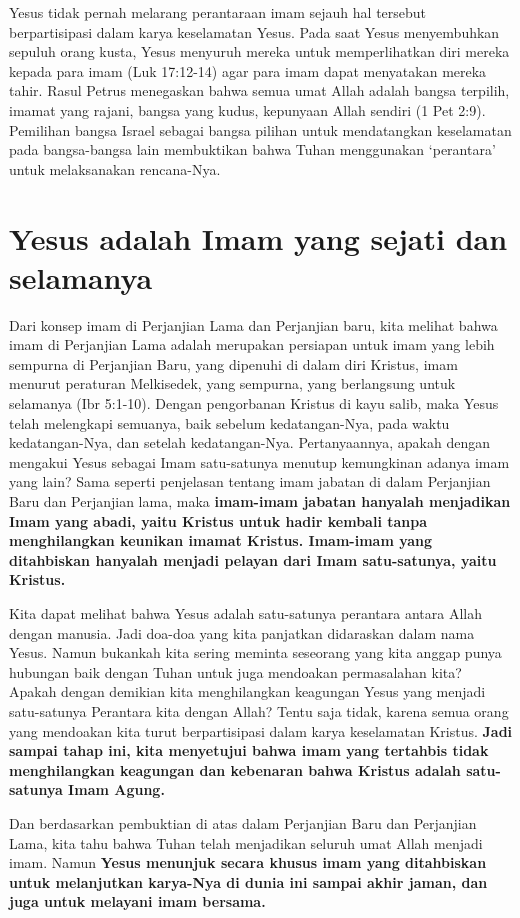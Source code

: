 Yesus tidak pernah melarang perantaraan imam sejauh hal tersebut berpartisipasi dalam karya keselamatan Yesus. Pada saat Yesus menyembuhkan sepuluh orang kusta, Yesus menyuruh mereka untuk memperlihatkan diri mereka kepada para imam (Luk 17:12-14) agar para imam dapat menyatakan mereka tahir. Rasul Petrus menegaskan bahwa semua umat Allah adalah bangsa terpilih, imamat yang rajani, bangsa yang kudus, kepunyaan Allah sendiri (1 Pet 2:9). Pemilihan bangsa Israel sebagai bangsa pilihan untuk mendatangkan keselamatan pada bangsa-bangsa lain membuktikan bahwa Tuhan menggunakan ‘perantara’ untuk melaksanakan rencana-Nya.

\section*{Yesus adalah Imam yang sejati dan selamanya}

Dari konsep imam di Perjanjian Lama dan Perjanjian baru, kita melihat bahwa imam di Perjanjian Lama adalah merupakan persiapan untuk imam yang lebih sempurna di Perjanjian Baru, yang dipenuhi di dalam diri Kristus, imam menurut peraturan Melkisedek, yang sempurna, yang berlangsung untuk selamanya (Ibr 5:1-10). Dengan pengorbanan Kristus di kayu salib, maka Yesus telah melengkapi semuanya, baik sebelum kedatangan-Nya, pada waktu kedatangan-Nya, dan setelah kedatangan-Nya. Pertanyaannya, apakah dengan mengakui Yesus sebagai Imam satu-satunya menutup kemungkinan adanya imam yang lain? Sama seperti penjelasan tentang imam jabatan di dalam Perjanjian Baru dan Perjanjian lama, maka \textbf{imam-imam jabatan hanyalah menjadikan Imam yang abadi, yaitu Kristus untuk hadir kembali tanpa menghilangkan keunikan imamat Kristus. Imam-imam yang ditahbiskan hanyalah menjadi pelayan dari Imam satu-satunya, yaitu Kristus.}

Kita dapat melihat bahwa Yesus adalah satu-satunya perantara antara Allah dengan manusia. Jadi doa-doa yang kita panjatkan didaraskan dalam nama Yesus. Namun bukankah kita sering meminta seseorang yang kita anggap punya hubungan baik dengan Tuhan untuk juga mendoakan permasalahan kita? Apakah dengan demikian kita menghilangkan keagungan Yesus yang menjadi satu-satunya Perantara kita dengan Allah? Tentu saja tidak, karena semua orang yang mendoakan kita turut berpartisipasi dalam karya keselamatan Kristus. \textbf{Jadi sampai tahap ini, kita menyetujui bahwa imam yang tertahbis tidak menghilangkan keagungan dan kebenaran bahwa Kristus adalah satu-satunya Imam Agung.}

Dan berdasarkan pembuktian di atas dalam Perjanjian Baru dan Perjanjian Lama, kita tahu bahwa Tuhan telah menjadikan seluruh umat Allah menjadi imam. Namun \textbf{Yesus menunjuk secara khusus imam yang ditahbiskan untuk melanjutkan karya-Nya di dunia ini sampai akhir jaman, dan juga untuk melayani imam bersama.}

